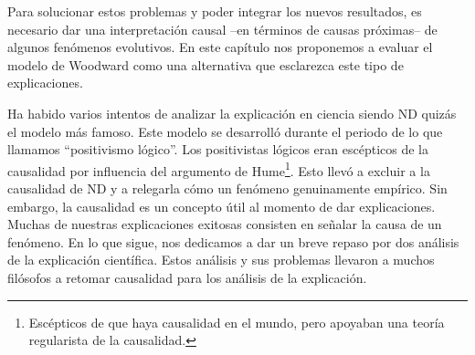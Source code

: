 

Para solucionar estos problemas y poder integrar los nuevos resultados, es necesario dar una interpretación causal --en términos de causas próximas-- de algunos fenómenos evolutivos. En este capítulo nos proponemos a evaluar el modelo de Woodward como una alternativa que esclarezca este tipo de explicaciones.



Ha habido varios intentos de analizar la explicación en ciencia siendo ND quizás el modelo más famoso. Este modelo se desarrolló durante el periodo de lo que llamamos ``positivismo lógico''. Los positivistas lógicos eran escépticos de la causalidad por influencia del argumento de Hume\footnote{Escépticos de que haya causalidad en el mundo, pero apoyaban una teoría regularista de la causalidad.}. Esto llevó a excluir a la causalidad de ND y a relegarla cómo un fenómeno genuinamente empírico. Sin embargo, la causalidad es un concepto útil al momento de dar explicaciones. Muchas de nuestras explicaciones exitosas consisten en señalar la causa de un fenómeno. En lo que sigue, nos dedicamos a dar un breve repaso por dos análisis de la explicación científica. Estos análisis y sus problemas llevaron a muchos filósofos a retomar causalidad para los análisis de la explicación.

